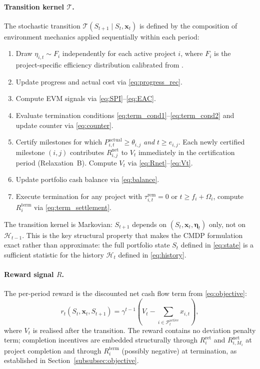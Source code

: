 \paragraph{Transition kernel $\mathcal{T}$.}
The stochastic transition
$\mathcal{T}(S_{t+1} \mid S_t, \mathbf{x}_t)$ is defined by the
composition of environment mechanics applied sequentially within each
period:
\begin{enumerate}[label=(\roman*)]
  \item Draw $\eta_{i,t} \sim F_i$ independently for each active
    project $i$, where $F_i$ is the project-specific efficiency
    distribution calibrated from \citet{Acebes2015, Batselier2017}.
  \item Update progress and actual cost via \eqref{eq:progress_rec}.
  \item Compute EVM signals via \eqref{eq:SPI}--\eqref{eq:EAC}.
  \item Evaluate termination conditions
    \eqref{eq:term_cond1}--\eqref{eq:term_cond2} and update counter
    via \eqref{eq:counter}.
  \item Certify milestones for which $P_{i,t}^{\mathrm{actual}} \geq
    \theta_{i,j}$ \emph{and} $t \geq e_{i,j}$. Each newly certified
    milestone $(i,j)$ contributes $R_{i,j}^{\mathrm{net}}$ to $V_t$
    immediately in the certification period (Relaxation~B). Compute
    $V_t$ via \eqref{eq:Rnet}--\eqref{eq:Vt}.
  \item Update portfolio cash balance via \eqref{eq:balance}.
  \item Execute termination for any project with
    $\tau_{i,t}^{\mathrm{rem}} = 0$ or $t \geq f_i + \Omega_i$,
    compute $R_i^{\mathrm{term}}$ via \eqref{eq:term_settlement}.
\end{enumerate}
The transition kernel is Markovian: $S_{t+1}$ depends on
$(S_t, \mathbf{x}_t, \boldsymbol{\eta}_t)$ only, not on
$\mathcal{H}_{t-1}$. This is the key structural property that makes
the CMDP formulation exact rather than approximate: the full portfolio
state $S_t$ defined in \eqref{eq:state} is a sufficient statistic for
the history $\mathcal{H}_t$ defined in \eqref{eq:history}.

\paragraph{Reward signal $R$.}
The per-period reward is the discounted net cash flow term from
\eqref{eq:objective}:
\begin{equation}
  r_t(S_t, \mathbf{x}_t, S_{t+1})
    = \gamma^{t-1}\!\left(
        V_t - \sum_{i \in \mathcal{P}_t^{\mathrm{active}}} x_{i,t}
      \right),
  \label{eq:l3_reward}
\end{equation}
where $V_t$ is realised after the transition. The reward contains no
deviation penalty term; completion incentives are embedded structurally
through $R_i^{\mathrm{ret}}$ and $R_{i,M_i}^{\mathrm{net}}$ at
project completion and through $R_i^{\mathrm{term}}$ (possibly
negative) at termination, as established in
Section~\ref{subsubsec:objective}.

